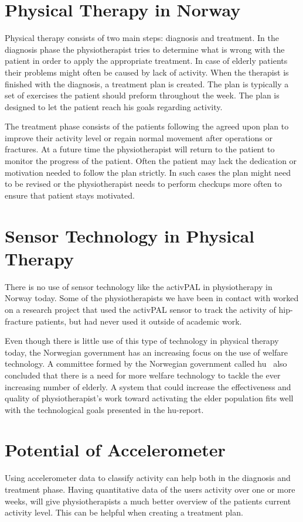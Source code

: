 \section{Physical Therapy in Norway}
Physical therapy consists of two main steps: diagnosis and treatment. In the diagnosis phase the physiotherapist tries to determine what is wrong with the patient in order to apply the appropriate treatment. In case of elderly patients their problems might often be caused by lack of activity. When the therapist is finished with the diagnosis, a treatment plan is created. The plan is typically a set of exercises the patient should preform throughout the week. The plan is designed to let the patient reach his goals regarding activity.

The treatment phase consists of the patients following the agreed upon plan to improve their activity level or regain normal movement after operations or fractures. At a future time the physiotherapist will return to the patient to monitor the progress of the patient. Often the patient may lack the dedication or motivation needed to follow the plan strictly. In such cases the plan might need to be revised or the physiotherapist needs to perform checkups more often to ensure that patient stays motivated.

\section{Sensor Technology in Physical Therapy}
There is no use of sensor technology like the activPAL in physiotherapy in Norway today. Some of the physiotherapists we have been in contact with worked on a research project that used the activPAL sensor to track the activity of hip-fracture patients, but had never used it outside of academic work.

Even though there is little use of this type of technology in physical therapy today, the Norwegian government has an increasing focus on the use of welfare technology. A committee formed by the Norwegian government called \gls{hu}~\cite{haagen} also concluded that there is a need for more welfare technology to tackle the ever increasing number of elderly. A system that could increase the effectiveness and quality of physiotherapist's work toward activating the elder population fits well with the technological goals presented in the \gls{hu}-report.  

\section{Potential of Accelerometer}
Using accelerometer data to classify activity can help both in the diagnosis and treatment phase. Having quantitative data of the users activity over one or more weeks, will give physiotherapists a much better overview of the patients current activity level. This can be helpful when creating a treatment plan.

